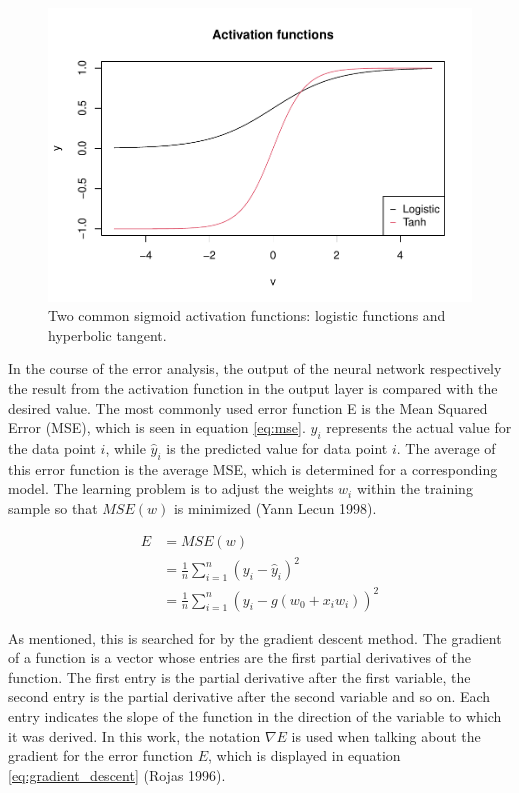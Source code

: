 \documentclass[
]{article}
\begin{document}
\begin{figure}

{\centering \includegraphics{03_theoretical-background_files/figure-latex/sigmoid-1} 

}

\caption{Two common sigmoid activation functions: logistic functions and hyperbolic tangent.}\label{fig:sigmoid}
\end{figure}

In the course of the error analysis, the output of the neural network
respectively the result from the activation function in the output layer
is compared with the desired value. The most commonly used error
function E is the Mean Squared Error (MSE), which is seen in equation
\ref{eq:mse}. \(y_{i}\) represents the actual value for the data point
\(i\), while \(\hat{y}_{i}\) is the predicted value for data point
\(i\). The average of this error function is the average MSE, which is
determined for a corresponding model. The learning problem is to adjust
the weights \(w_{i}\) within the training sample so that \(MSE(w)\) is
minimized (Yann Lecun 1998).

\begin{align} \label{eq:mse}
  E &=MSE(w) \\
  &=\frac{1}{n}\sum_{i = 1}^{n}(y_{i}-\hat{y}_{i})^2 \nonumber \\
  &=\frac{1}{n}\sum_{i = 1}^{n}(y_{i}-g(w_{0}+x_{i}w_{i}))^2 \nonumber 
\end{align}

As mentioned, this is searched for by the gradient descent method. The
gradient of a function is a vector whose entries are the first partial
derivatives of the function. The first entry is the partial derivative
after the first variable, the second entry is the partial derivative
after the second variable and so on. Each entry indicates the slope of
the function in the direction of the variable to which it was derived.
In this work, the notation \(\nabla{E}\) is used when talking about the
gradient for the error function \(E\), which is displayed in equation
\ref{eq:gradient_descent} (Rojas 1996).
\end{document}
